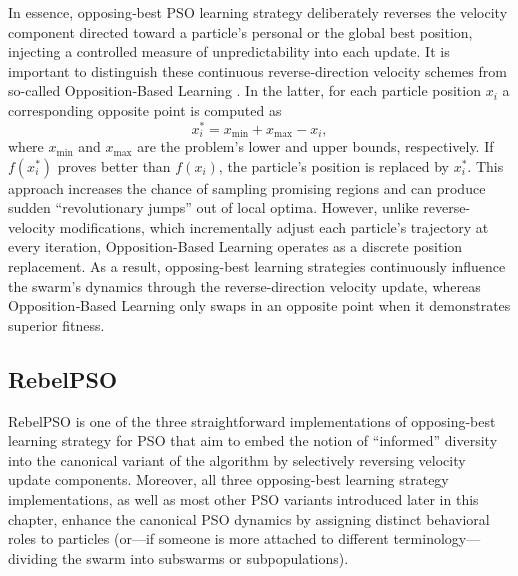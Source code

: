 {In essence, opposing‐best PSO learning strategy deliberately reverses the velocity component directed toward a particle's personal or the global best position, injecting a controlled measure of unpredictability into each update.
It is important to distinguish these continuous reverse‐direction velocity schemes from so-called Opposition‐Based Learning \citep[see, e.g.,][]{tizhoosh2005opposition,tizhoosh2006opposition,zhou2020improved}. In the latter, for each particle position $x_i$ a corresponding opposite point is computed as
\begin{equation}
    x_{i}^{*} = x_{\min} + x_{\max} - x_i,
\end{equation}
where $x_{\min}$ and $x_{\max}$ are the problem’s lower and upper bounds, respectively. If $f(x_{i}^{*})$ proves better than $f(x_i)$, the particle’s position is replaced by $x_{i}^{*}$. This approach increases the chance of sampling promising regions and can produce sudden ``revolutionary jumps'' out of local optima. However, unlike reverse-velocity modifications, which incrementally adjust each particle’s trajectory at every iteration, Op\-po\-si\-tion\-\mbox{-Based} Learning operates as a discrete position replacement. As a result, opposing-best learning strategies continuously influence the swarm's dynamics through the reverse\--di\-rec\-tion velocity update, whereas Opposition‐Based Learning only swaps in an opposite point when it demonstrates superior fitness.






\subsection{RebelPSO}

RebelPSO is one of the three straightforward implementations of opposing-best learning strategy for PSO that aim to embed the notion of ``informed'' diversity into the canonical variant of the algorithm by selectively reversing velocity update components.
Moreover, all three opposing-best learning strategy implementations, as well as most other PSO variants introduced  later in this chapter, enhance the canonical PSO dynamics by assigning distinct behavioral roles to particles  (or---if someone is more attached to different terminology---dividing the swarm into subswarms or subpopulations).



}
